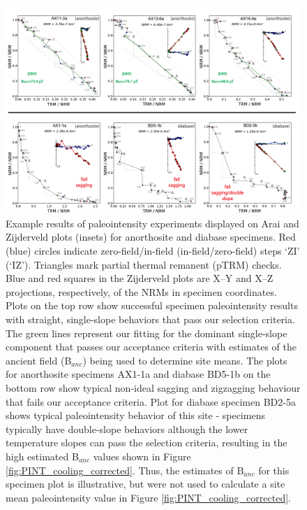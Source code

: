 \documentclass[9pt,twocolumn,twoside,lineno]{pnas-new}
\begin{document}
\begin{figure}[h!]
\noindent\includegraphics[width=\textwidth]{IZZI_examples.pdf}
\centering
\caption{\footnotesize{Example results of paleointensity experiments displayed on Arai and Zijderveld plots (insets) for anorthosite and diabase specimens. Red (blue) circles indicate zero-field/in-field (in-field/zero-field) steps `ZI’ (`IZ’). Triangles mark partial thermal remanent (pTRM) checks. Blue and red squares in the Zijderveld plots are X–Y and X–Z projections, respectively, of the NRMs in specimen coordinates. Plots on the top row show successful specimen paleointensity results with straight, single-slope behaviors that pass our selection criteria. The green lines represent our fitting for the dominant single-slope component that passes our acceptance criteria with estimates of the ancient field (B$_{anc}$) being used to determine site means. The plots for anorthosite specimens AX1-1a and diabase BD5-1b on the bottom row show typical non-ideal sagging and zigzagging behaviour that fails our acceptance criteria. Plot for diabase specimen BD2-5a shows typical paleointensity behavior of this site - specimens typically have double-slope behaviors although the lower temperature slopes can pass the selection criteria, resulting in the high estimated B$_{anc}$ values shown in Figure \ref{fig:PINT_cooling_corrected}. Thus, the estimates of B$_{anc}$ for this specimen plot is illustrative, but were not used to calculate a site mean paleointensity value in Figure \ref{fig:PINT_cooling_corrected}.}}
\label{fig:IZZI_examples}
\end{figure}
\end{document}
